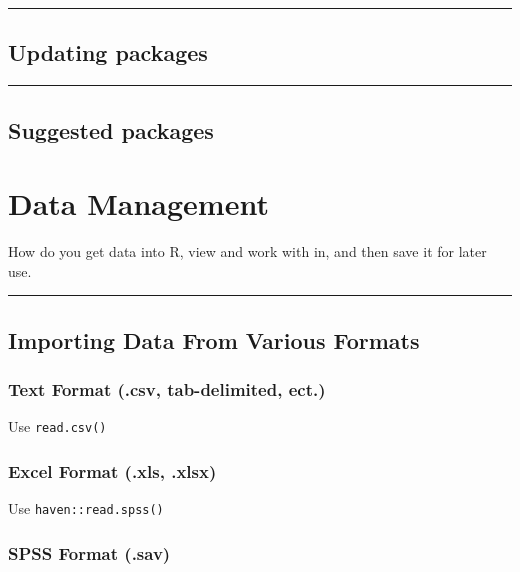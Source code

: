 \documentclass[]{book}
\begin{document}
\begin{center}\rule{0.5\linewidth}{\linethickness}\end{center}

\section{Updating packages}\label{updating-packages}

\begin{center}\rule{0.5\linewidth}{\linethickness}\end{center}

\section{Suggested packages}\label{suggested-packages}

\chapter{Data Management}\label{data-management}

How do you get data into R, view and work with in, and then save it for
later use.

\begin{center}\rule{0.5\linewidth}{\linethickness}\end{center}

\section{Importing Data From Various
Formats}\label{importing-data-from-various-formats}

\subsection{Text Format (.csv, tab-delimited,
ect.)}\label{text-format-.csv-tab-delimited-ect.}

Use \texttt{read.csv()}

\subsection{Excel Format (.xls, .xlsx)}\label{excel-format-.xls-.xlsx}

Use \texttt{haven::read.spss()}

\subsection{SPSS Format (.sav)}\label{spss-format-.sav}
\end{document}
